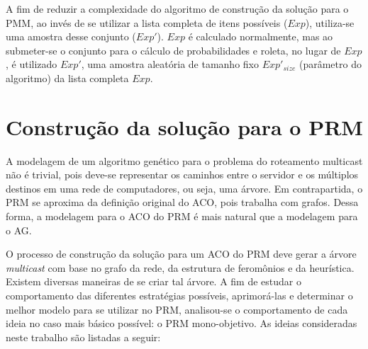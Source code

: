 A fim de reduzir a complexidade do algoritmo de construção da solução para o PMM, ao invés de se utilizar a lista completa de itens possíveis ($Exp$), utiliza-se uma amostra desse conjunto ($Exp'$). $Exp$ é calculado normalmente, mas ao submeter-se o conjunto para o cálculo de probabilidades e roleta, no lugar de $Exp$, é utilizado $Exp'$, uma amostra aleatória de tamanho fixo $Exp'_{size}$ (parâmetro do algoritmo) da lista completa $Exp$.

\section{Construção da solução para o PRM}
\label{section_algoritmo_prm}

A modelagem de um algoritmo genético para o problema do roteamento multicast não é trivial, pois deve-se representar os caminhos entre o servidor e os múltiplos destinos em uma rede de computadores, ou seja, uma árvore. Em contrapartida, o PRM se aproxima da definição original do ACO, pois trabalha com grafos. Dessa forma, a modelagem para o ACO do PRM é mais natural que a modelagem para o AG.

O processo de construção da solução para um ACO do PRM deve gerar a árvore \textit{multicast} com base no grafo da rede, da estrutura de feromônios e da heurística. Existem diversas maneiras de se criar tal árvore. A fim de estudar o comportamento das diferentes estratégias possíveis, aprimorá-las e determinar o melhor modelo para se utilizar no PRM, analisou-se o comportamento de cada ideia no caso mais básico possível: o PRM mono-objetivo. As ideias consideradas neste trabalho são listadas a seguir:

